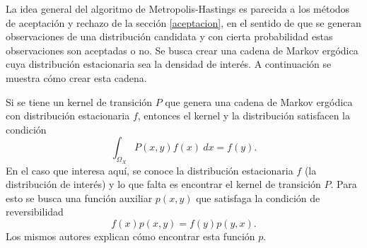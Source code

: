 \documentclass[11pt,a4paper]{article}
\begin{document}
La idea general del algoritmo de Metropolis-Hastings es parecida a los métodos de aceptación y rechazo de la sección \ref{aceptacion}, en el sentido de que se generan observaciones de una distribución candidata y con cierta probabilidad estas observaciones son aceptadas o no. Se busca crear una cadena de Markov ergódica cuya distribución estacionaria sea la densidad de interés. A continuación se muestra cómo crear esta cadena.

Si se tiene un kernel de transición $P$ que genera una cadena de Markov ergódica con distribución estacionaria $f$, entonces el kernel y la distribución satisfacen la condición \citep{chib_mh}
$$\int_{\Omega_X} P(x, y)f(x) \ dx = f(y).$$ En el caso que interesa aquí, se conoce la distribución estacionaria $f$ (la distribución de interés) y lo que falta es encontrar el kernel de transición $P$. Para esto se busca una función auxiliar $p(x, y)$ que satisfaga la condición de reversibilidad \citep{chib_mh}
\begin{equation} \label{eq:reversibilidad}
f(x)p(x, y) = f(y)p(y, x).
\end{equation}
Los mismos autores explican cómo encontrar esta función $p$.
\end{document}
